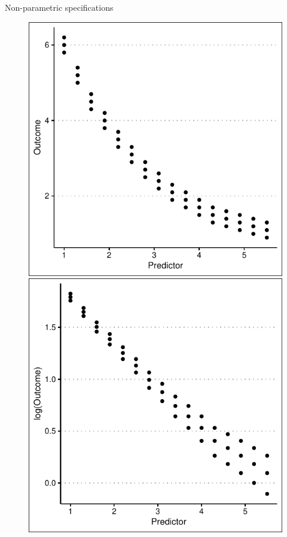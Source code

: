 \documentclass[12pt,english,pdf,xcolor=dvipsnames,aspectratio=169,handout]{beamer}\usepackage[]{graphicx}\usepackage[]{xcolor}
\begin{document}
\begin{frame}{Non-parametric specifications}
\begin{figure}
\centering
\includegraphics[scale=0.4]{../04-graphs/04-01}
\includegraphics[scale=0.4]{../04-graphs/04-02}
\end{figure}

\end{frame}
\end{document}
